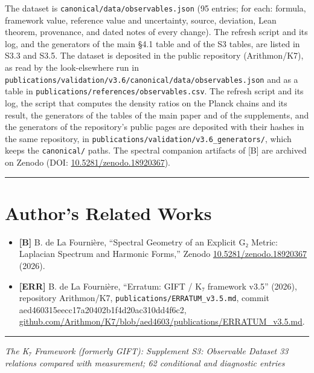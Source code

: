 \documentclass[11pt,a4paper]{article}
\begin{document}
The dataset is \texttt{canonical/\allowbreak{}data/\allowbreak{}observables.\allowbreak{}json} (95 entries; for each: formula, framework value, reference value and uncertainty, source, deviation, Lean theorem, provenance, and dated notes of every change). The refresh script and its log, and the generators of the main §4.1 table and of the S3 tables, are listed in S3.3 and S3.5. The dataset is deposited in the public repository (Arithmon/K7), as read by the look-elsewhere run in \texttt{publications/\allowbreak{}validation/\allowbreak{}v3.\allowbreak{}6/\allowbreak{}canonical/\allowbreak{}data/\allowbreak{}observables.\allowbreak{}json} and as a table in \texttt{publications/\allowbreak{}references/\allowbreak{}observables.\allowbreak{}csv}. The refresh script and its log, the script that computes the density ratios on the Planck chains and its result, the generators of the tables of the main paper and of the supplements, and the generators of the repository's public pages are deposited with their hashes in the same repository, in \texttt{publications/\allowbreak{}validation/\allowbreak{}v3.\allowbreak{}6\_\allowbreak{}generators/\allowbreak{}}, which keeps the \texttt{canonical/\allowbreak{}} paths. The spectral companion artifacts of {[}B{]} are archived on Zenodo (DOI: \href{https://doi.org/10.5281/zenodo.18920367}{10.5281/zenodo.18920367}).

\begin{center}\rule{\linewidth}{0.5pt}\end{center}

\section{Author's Related Works}\label{authors-related-works}

\begin{itemize}
\tightlist
\item
  \textbf{{[}B{]}} B. de La Fournière, ``Spectral Geometry of an Explicit G₂ Metric: Laplacian Spectrum and Harmonic Forms,'' Zenodo \href{https://doi.org/10.5281/zenodo.18920367}{10.5281/zenodo.18920367} (2026).
\item
  \textbf{{[}ERR{]}} B. de La Fournière, ``Erratum: GIFT / K₇ framework v3.5'' (2026), repository Arithmon/K7, \texttt{publications/\allowbreak{}ERRATUM\_\allowbreak{}v3.\allowbreak{}5.\allowbreak{}md}, commit aed460315eecc17a20402b1f4d20ac310dd4f6c2, \href{https://github.com/Arithmon/K7/blob/aed460315eecc17a20402b1f4d20ac310dd4f6c2/publications/ERRATUM_v3.5.md}{github.com/Arithmon/K7/blob/aed4603/publications/ERRATUM\_\allowbreak{}v3.5.md}.
\end{itemize}

\begin{center}\rule{\linewidth}{0.5pt}\end{center}

\emph{The K₇ Framework (formerly GIFT): Supplement S3: Observable Dataset} \emph{33 relations compared with measurement; 62 conditional and diagnostic entries}


\bigskip

\end{document}
